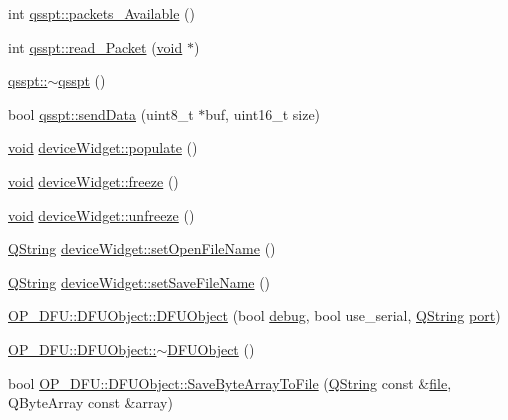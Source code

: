 \begin{DoxyCompactItemize}
\item 
int \hyperlink{group___uploader_ga4fd481f6796cd770176f43ddc097ebe8}{qsspt\-::packets\-\_\-\-Available} ()
\item 
int \hyperlink{group___uploader_gab8eb0ccb0806be7a169c335cab1e4d0c}{qsspt\-::read\-\_\-\-Packet} (\hyperlink{group___u_a_v_objects_plugin_ga444cf2ff3f0ecbe028adce838d373f5c}{void} $\ast$)
\item 
\hyperlink{group___uploader_ga05f94a4538efa2bacd837e2b0684d6b3}{qsspt\-::$\sim$qsspt} ()
\item 
bool \hyperlink{group___uploader_ga7711ea10887bffa2d338e45bfdd564a2}{qsspt\-::send\-Data} (uint8\-\_\-t $\ast$buf, uint16\-\_\-t size)
\item 
\hyperlink{group___u_a_v_objects_plugin_ga444cf2ff3f0ecbe028adce838d373f5c}{void} \hyperlink{group___uploader_gaf56d7d5fb2715ab7213ea4193df3b373}{device\-Widget\-::populate} ()
\item 
\hyperlink{group___u_a_v_objects_plugin_ga444cf2ff3f0ecbe028adce838d373f5c}{void} \hyperlink{group___uploader_gac5513bd475a701ede81cde9432e8ddf2}{device\-Widget\-::freeze} ()
\item 
\hyperlink{group___u_a_v_objects_plugin_ga444cf2ff3f0ecbe028adce838d373f5c}{void} \hyperlink{group___uploader_ga6273e94cd08759c019fbb9a1063cbd26}{device\-Widget\-::unfreeze} ()
\item 
\hyperlink{group___u_a_v_objects_plugin_gab9d252f49c333c94a72f97ce3105a32d}{\-Q\-String} \hyperlink{group___uploader_ga6ad26364234edf8c743b0b08885050b1}{device\-Widget\-::set\-Open\-File\-Name} ()
\item 
\hyperlink{group___u_a_v_objects_plugin_gab9d252f49c333c94a72f97ce3105a32d}{\-Q\-String} \hyperlink{group___uploader_ga1c33b640cfaca086fcfd5574eecec8ef}{device\-Widget\-::set\-Save\-File\-Name} ()
\item 
\hyperlink{group___uploader_gacb8ee3e1b1358ae25813e37f08b6d510}{\-O\-P\-\_\-\-D\-F\-U\-::\-D\-F\-U\-Object\-::\-D\-F\-U\-Object} (bool \hyperlink{synchronousprocess_8cpp_abed82baf7f470b522273a3e37c24c600a5be0fd270d9cbf6a0b7445db855089da}{debug}, bool use\-\_\-serial, \hyperlink{group___u_a_v_objects_plugin_gab9d252f49c333c94a72f97ce3105a32d}{\-Q\-String} \hyperlink{classport}{port})
\item 
\hyperlink{group___uploader_gad3eb7cce298c72c456a84eb04cc9c0fe}{\-O\-P\-\_\-\-D\-F\-U\-::\-D\-F\-U\-Object\-::$\sim$\-D\-F\-U\-Object} ()
\item 
bool \hyperlink{group___uploader_ga1422e01836cfff2d47cd09bfbbdde774}{\-O\-P\-\_\-\-D\-F\-U\-::\-D\-F\-U\-Object\-::\-Save\-Byte\-Array\-To\-File} (\hyperlink{group___u_a_v_objects_plugin_gab9d252f49c333c94a72f97ce3105a32d}{\-Q\-String} const \&\hyperlink{uavobjecttemplate_8m_a97c04efa65bcf0928abf9260bc5cbf46}{file}, \-Q\-Byte\-Array const \&array)

\end{DoxyCompactItemize}
